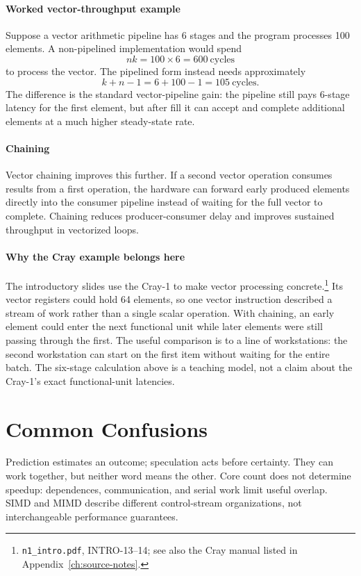 \paragraph{Worked vector-throughput example}\label{par:auto-007b}
Suppose a vector arithmetic pipeline has 6 stages and the program processes 100 elements.
A non-pipelined implementation would spend
\begin{equation}\label{eq:auto-001a}
    nk = 100\times 6 = 600\ \text{cycles}
\end{equation}
to process the vector.
The pipelined form instead needs approximately
\begin{equation}\label{eq:auto-001b}
    k+n-1 = 6+100-1 = 105\ \text{cycles}.
\end{equation}
The difference is the standard vector-pipeline gain: the pipeline still pays 6-stage latency for the first element, but after fill it can accept and complete additional elements at a much higher steady-state rate.

\paragraph{Chaining}\label{par:auto-008}
Vector chaining improves this further.
If a second vector operation consumes results from a first operation, the hardware can forward early produced elements directly into the consumer pipeline instead of waiting for the full vector to complete.
Chaining reduces producer-consumer delay and improves sustained throughput in vectorized loops.

\paragraph{Why the Cray example belongs here}
The introductory slides use the Cray-1 to make vector processing concrete.\footnote{\texttt{n1\_intro.pdf}, INTRO-13--14; see also the Cray manual listed in Appendix~\ref{ch:source-notes}.}
Its vector registers could hold 64 elements, so one vector instruction described a stream of work rather than a single scalar operation.
With chaining, an early element could enter the next functional unit while later elements were still passing through the first.
The useful comparison is to a line of workstations: the second workstation can start on the first item without waiting for the entire batch.
The six-stage calculation above is a teaching model, not a claim about the Cray-1's exact functional-unit latencies.


\section{Common Confusions}\label{sec:auto-008}
Prediction estimates an outcome; speculation acts before certainty.
They can work together, but neither word means the other.
Core count does not determine speedup: dependences, communication, and serial work limit useful overlap.
SIMD and MIMD describe different control-stream organizations, not interchangeable performance guarantees.

